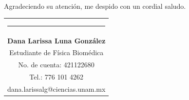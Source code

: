 \documentclass[9pt,letterpaper]{article}
\begin{document}
	\vspace{1cm}
	\noindent Agradeciendo su atención, me despido con un cordial saludo.
	
	\centering
	{\vspace{2.55cm}\begin{tabular} {c}
			\setlength{\tabcolsep}{30pt}
			\renewcommand{\arraystretch}{1}
			\noindent\rule{5.5cm}{0.4pt}\qquad \\
			
			\qquad  \textbf{Dana Larissa Luna González} \qquad \\
			\qquad Estudiante de Física Biomédica  \qquad \\ \qquad 
			No. de cuenta: 421122680\qquad \\  
			\qquad  Tel.: 776 101 4262 \qquad \\
			\qquad dana.larissalg@ciencias.unam.mx \qquad \\
			
		\end{tabular}
	}
	
	
	
	
	
	
	
\end{document}
